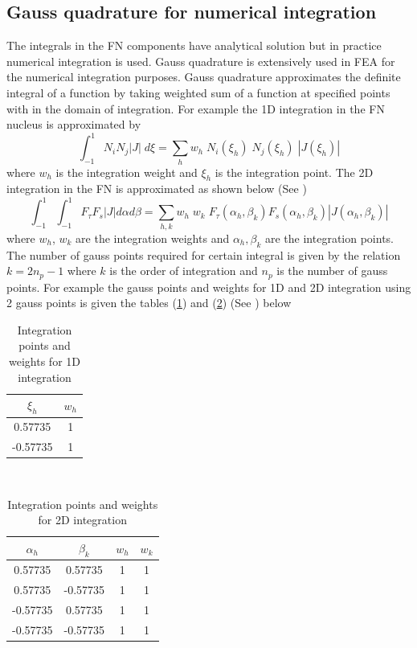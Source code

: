 \documentclass[a4paper,12pt]{article}
\begin{document}
\subsection*{Gauss quadrature for numerical integration}
\indent\indent\indent\indent The integrals in the FN components have analytical solution but in practice numerical integration is used. Gauss quadrature is extensively used in FEA for the numerical integration purposes. Gauss quadrature approximates the definite integral of a function by taking weighted sum of a function at specified points with in the domain of integration. For example the 1D integration in the FN nucleus is approximated by $$\int_{-1}^{1} N_{i} N_{j}|J|\;d\xi = \sum_{h}^{} w_{h}\; N_{i}(\xi_{h})\; N_{j}(\xi_{h})\;|J(\xi_{h})|$$ where $w_{h}$ is the integration weight and $\xi_{h}$ is the integration point. The 2D integration in the FN is approximated as shown below (See \cite{carrera2014finite})$$\int_{-1}^{1}\int_{-1}^{1} F_{\tau}F_{s} |J| d\alpha d\beta = \sum_{h,k}^{} w_{h}\;w_{k}\;  F_{\tau}(\alpha_{h},\beta_{k})F_{s}(\alpha_{h},\beta_{k}) |J(\alpha_{h},\beta_{k})|$$ where $w_{h}$,   $w_{k}$ are the integration weights and $\alpha_{h},\beta_{k}$ are the integration points.
The number of gauss points required for certain integral is given by the relation $ k = 2n_{p} - 1$ where $k$ is the order of integration and $n_{p}$ is the number of gauss points. For example the gauss points and weights for 1D and 2D integration using 2 gauss points is given the tables (\ref{tab:table2}) and (\ref{tab:table3}) (See \cite{carrera2014finite}) below 
\begin{table}[h!]
  \begin{center}
     \begin{tabular}{c|c} 
      \textbf{$\xi_{h}$} & \textbf{$w_{h}$}\\
      \hline
      0.57735 & 1 \\
      -0.57735& 1 \\
       
    \end{tabular}
    \caption{Integration points and weights for 1D integration}
    \label{tab:table2}
  \end{center}
\end{table}\\
\begin{table}[h!]
  \begin{center}
     \begin{tabular}{c|c|c|c} 
      \textbf{$\alpha_{h}$} & \textbf{$\beta_{k}$} &     \textbf{$w_{h}$} & \textbf{$w_{k}$}\\
      \hline
      0.57735 & 0.57735 & 1 & 1\\
       0.57735 &-0.57735 &1 & 1\\
     -0.57735 & 0.57735 & 1 & 1\\
     -0.57735 &-0.57735 &1 & 1\\
    \end{tabular}
    \caption{Integration points and weights for 2D integration}
    \label{tab:table3}
  \end{center}
\end{table}
\end{document}
